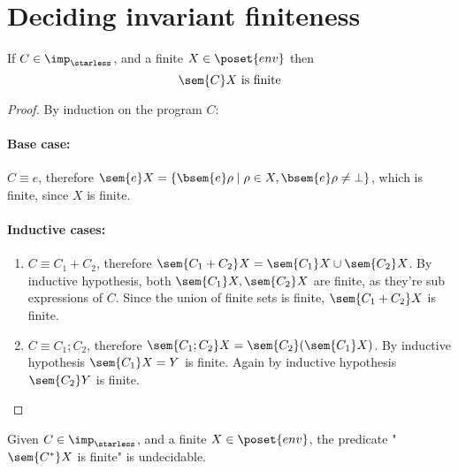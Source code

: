 \section{Deciding invariant finiteness}

\begin{lemma}\label{le:finiteness}
  If \(C\in\imp_\starless\), and a finite \(X \in \poset{env}\)
  then \[\sem{C}X \text{ is finite}\]
\end{lemma}

\begin{proof}
  By induction on the program \(C\):
  \paragraph*{Base case:\\}
  \(C \equiv e\), therefore \(\sem{e}X = \{\bsem{e}\rho \mid \rho \in
  X , \bsem{e}\rho \neq \bot\}\), which is finite, since \(X\) is
  finite.
  
  \paragraph*{Inductive cases:\\}
  \begin{enumerate}
  \item \(C\equiv C_1 + C_2\), therefore \(\sem{C_1 + C_2} X =
    \sem{C_1}X \cup \sem{C_2}X\). By inductive hypothesis, both
    \(\sem{C_1}X, \sem{C_2}X\) are finite, as they're sub expressions
    of \(C\). Since the union of finite sets is finite, \(\sem{C_1 +
      C_2}X\) is finite.
  \item \(C\equiv C_1; C_2\), therefore \(\sem{C_1;C_2}X =
    \sem{C_2}(\sem{C_1}X)\). By inductive hypothesis \(\sem{C_1}X =
    Y\) is finite. Again by inductive hypothesis \(\sem{C_2}Y\) is
    finite.
  \end{enumerate}
\end{proof}

\begin{lemma}\label{le:infiniteness}
  Given \(C\in\imp_\starless\), and a finite \(X \in \poset{env}\),
  the predicate "\(\sem{C^*}X\) is finite" is undecidable.
\end{lemma}

